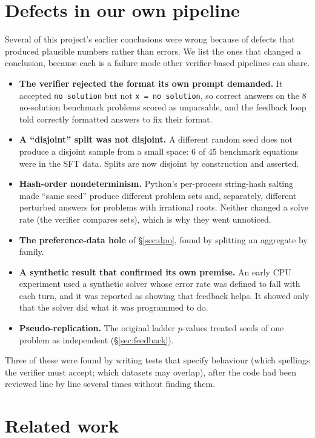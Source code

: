 \documentclass[10pt]{article}
\begin{document}
\section{Defects in our own pipeline}
\label{sec:defects}

Several of this project's earlier conclusions were wrong because of defects that
produced plausible numbers rather than errors. We list the ones that changed a
conclusion, because each is a failure mode other verifier-based pipelines can share.
\begin{itemize}
\item \textbf{The verifier rejected the format its own prompt demanded.} It accepted
\texttt{no solution} but not \texttt{x = no solution}, so correct answers on the 8
no-solution benchmark problems scored as unparsable, and the feedback loop told
correctly formatted answers to fix their format.
\item \textbf{A ``disjoint'' split was not disjoint.} A different random seed does not
produce a disjoint sample from a small space: 6 of 45 benchmark equations were in the
SFT data. Splits are now disjoint by construction and asserted.
\item \textbf{Hash-order nondeterminism.} Python's per-process string-hash salting made
``same seed'' produce different problem sets and, separately, different perturbed
answers for problems with irrational roots. Neither changed a solve rate (the verifier
compares sets), which is why they went unnoticed.
\item \textbf{The preference-data hole} of \S\ref{sec:dpo}, found by splitting an
aggregate by family.
\item \textbf{A synthetic result that confirmed its own premise.} An early CPU
experiment used a synthetic solver whose error rate was defined to fall with each turn,
and it was reported as showing that feedback helps. It showed only that the solver did
what it was programmed to do.
\item \textbf{Pseudo-replication.} The original ladder $p$-values treated seeds of one
problem as independent (\S\ref{sec:feedback}).
\end{itemize}
Three of these were found by writing tests that specify behaviour (which spellings the
verifier must accept; which datasets may overlap), after the code had been reviewed
line by line several times without finding them.

\section{Related work}
\end{document}
